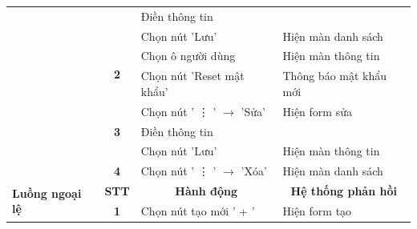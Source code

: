 \documentclass[../DoAn.tex]{subfiles}
\begin{document}
\begin{table}[H]
\begin{tabular}{|l|c|l|l|}
                                                 &                                                                              & Điền thông tin                            &                                                 \\
                                                 &                                                                              & Chọn nút 'Lưu'                            & Hiện màn danh sách                              \\ \cline{2-4}
                                                 & \multirow{2}{*}{\textbf{2}}                                                  & Chọn ô người dùng                         & Hiện màn thông tin                              \\ \cline{3-4}
                                                 &                                                                              & Chọn nút 'Reset mật khẩu'                 & Thông báo mật khẩu mới                          \\ \cline{2-4}
                                                 & \multirow{3}{*}{\textbf{3}}                                                  & Chọn nút ' \vdots{} ' $\rightarrow$ 'Sửa' & Hiện form sửa                                   \\ \cline{3-4}
                                                 &                                                                              & Điền thông tin                            &                                                 \\
                                                 &                                                                              & Chọn nút 'Lưu'                            & Hiện màn thông tin                              \\ \cline{2-4}
                                                 & \multirow{1}{*}{\textbf{4}}                                                  & Chọn nút ' \vdots{} ' $\rightarrow$ 'Xóa' & Hiện màn danh sách                              \\ \hline
        \multirow{4}{*}{\textbf{Luồng ngoại lệ}} & \multicolumn{1}{c|}{\textbf{STT}}                                            & \multicolumn{1}{c|}{\textbf{Hành động}}   & \multicolumn{1}{c|}{\textbf{Hệ thống phản hồi}} \\ \cline{2-4}
                                                 & \multirow{3}{*}{\textbf{1}}                                                  & Chọn nút tạo mới ' + '                    & Hiện form tạo                                   \\ \cline{3-4}

\end{tabular}
\end{table}
\end{document}
